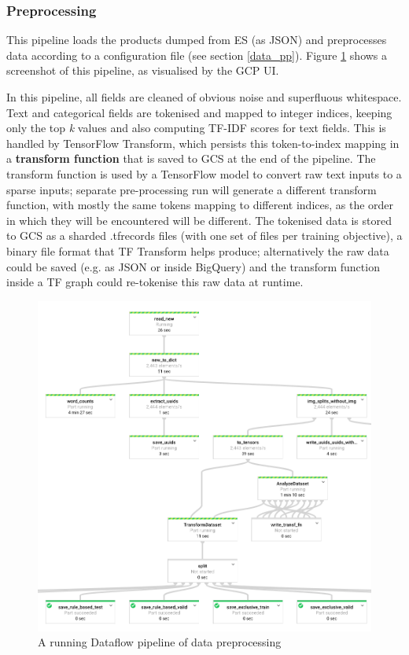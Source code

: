 \subsubsection{Preprocessing}

This pipeline loads the products dumped from ES (as JSON) and preprocesses data according to a configuration file (see section \ref{data_pp}).
Figure \ref{df} shows a screenshot of this pipeline, as visualised by the GCP UI.

In this pipeline, all fields are cleaned of obvious noise and superfluous whitespace.
Text and categorical fields are tokenised and mapped to integer indices, keeping only the top \textit{k} values and also computing TF-IDF scores for text fields.
This is handled by TensorFlow Transform, which persists this token-to-index mapping in a \textbf{transform function} that is saved to GCS at the end of the pipeline.
The transform function is used by a TensorFlow model to convert raw text inputs to a  sparse inputs;
separate pre-processing run will generate a different transform function, with mostly the same tokens mapping to different indices, as the order in which they will be encountered will be different.
The tokenised data is stored to GCS as a sharded .tfrecords files (with one set of files per training objective), a binary file format that TF Transform helps produce; alternatively the raw data could be saved (e.g. as JSON or inside BigQuery) and the transform function inside a TF graph could re-tokenise this raw data at runtime.

\begin{figure}
  \includegraphics[width=\linewidth]{figures/df}
  \caption{A running Dataflow pipeline of data preprocessing}
  \label{df}
\end{figure}

